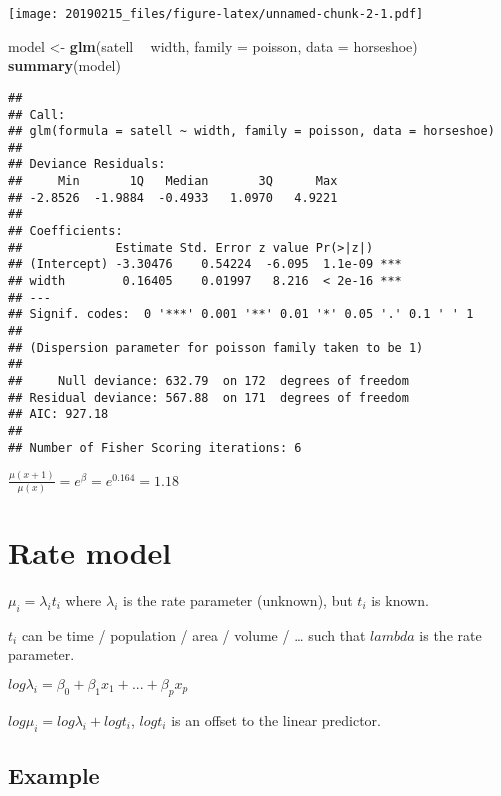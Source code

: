 \documentclass[]{article}
\newenvironment{Shaded}{\begin{snugshade}}{\end{snugshade}}
\newcommand{\DataTypeTok}[1]{\textcolor[rgb]{0.13,0.29,0.53}{#1}}
\newcommand{\KeywordTok}[1]{\textcolor[rgb]{0.13,0.29,0.53}{\textbf{#1}}}
\newcommand{\NormalTok}[1]{#1}
\newcommand{\OperatorTok}[1]{\textcolor[rgb]{0.81,0.36,0.00}{\textbf{#1}}}
\newcommand{\StringTok}[1]{\textcolor[rgb]{0.31,0.60,0.02}{#1}}
\begin{document}
\texttt{[image: 20190215\_files/figure-latex/unnamed-chunk-2-1.pdf]}

\begin{Shaded}
\begin{Highlighting}[]
\NormalTok{model <-}\StringTok{ }\KeywordTok{glm}\NormalTok{(satell }\OperatorTok{~}\StringTok{ }\NormalTok{width, }\DataTypeTok{family =}\NormalTok{ poisson, }\DataTypeTok{data =}\NormalTok{ horseshoe)}
\KeywordTok{summary}\NormalTok{(model)}
\end{Highlighting}
\end{Shaded}

\begin{verbatim}
## 
## Call:
## glm(formula = satell ~ width, family = poisson, data = horseshoe)
## 
## Deviance Residuals: 
##     Min       1Q   Median       3Q      Max  
## -2.8526  -1.9884  -0.4933   1.0970   4.9221  
## 
## Coefficients:
##             Estimate Std. Error z value Pr(>|z|)    
## (Intercept) -3.30476    0.54224  -6.095  1.1e-09 ***
## width        0.16405    0.01997   8.216  < 2e-16 ***
## ---
## Signif. codes:  0 '***' 0.001 '**' 0.01 '*' 0.05 '.' 0.1 ' ' 1
## 
## (Dispersion parameter for poisson family taken to be 1)
## 
##     Null deviance: 632.79  on 172  degrees of freedom
## Residual deviance: 567.88  on 171  degrees of freedom
## AIC: 927.18
## 
## Number of Fisher Scoring iterations: 6
\end{verbatim}

\(\frac{\mu(x+1)}{\mu(x)} = e^\beta = e^{0.164} = 1.18\)

\hypertarget{rate-model}{%
\section{Rate model}\label{rate-model}}

\(\mu_i = \lambda_i t_i\) where \(\lambda_i\) is the rate parameter
(unknown), but \(t_i\) is known.

\(t_i\) can be time / population / area / volume / \ldots{} such that
\(lambda\) is the rate parameter.

\(log\lambda_i = \beta_0 + \beta_1 x_1 + ... + \beta_p x_p\)

\(log\mu_i = log\lambda_i + logt_i\), \(logt_i\) is an offset to the
linear predictor.

\hypertarget{example-1}{%
\subsection{Example}\label{example-1}}
\end{document}
